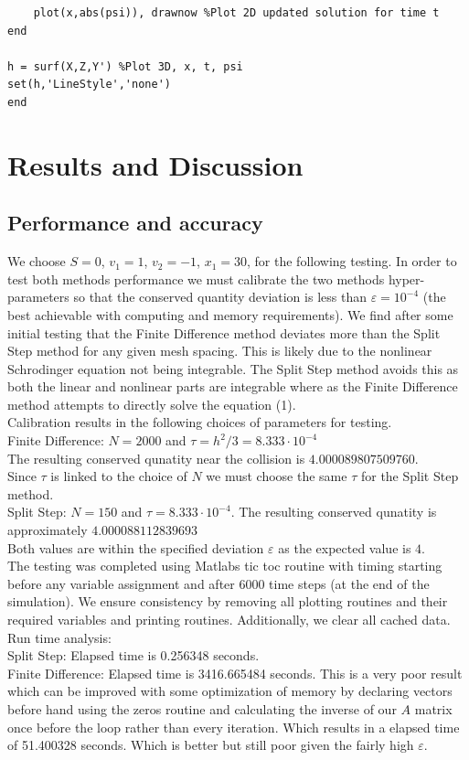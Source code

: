 \documentclass{article}
\begin{document}
\begin{lstlisting}
    plot(x,abs(psi)), drawnow %Plot 2D updated solution for time t
end

h = surf(X,Z,Y') %Plot 3D, x, t, psi
set(h,'LineStyle','none')
end
\end{lstlisting}
\pagebreak
\section{Results and Discussion}
\subsection{Performance and accuracy}
We choose $S=0$, $v_1 = 1$, $v_2 = -1$, $x_1 = 30$, for the following testing. 
In order to test both methods performance we must calibrate the two methods hyper-parameters so that the conserved quantity deviation is less than $\varepsilon = 10^{-4}$ (the best achievable with computing and memory requirements). We find after some initial testing that the Finite Difference method deviates more than the Split Step method for any given mesh spacing. This is likely due to the nonlinear Schrodinger equation not being integrable. The Split Step method avoids this as both the linear and nonlinear parts are integrable where as the Finite Difference method attempts to directly solve the equation (1). \\
Calibration results in the following choices of parameters for testing. \\
Finite Difference: $N=2000$ and $\tau = h^2/3 = 8.333\cdot 10^{-4}$ \\
The resulting conserved qunatity near the collision is $4.000089807509760$.\\
Since $\tau$ is linked to the choice of $N$ we must choose the same $\tau$ for the Split Step method. \\
Split Step: $N=150$ and $\tau = 8.333\cdot 10^{-4}$. The resulting conserved qunatity is approximately $4.000088112839693$\\
Both values are within the specified deviation $\varepsilon$ as the expected value is $4$.\\
The testing was completed using Matlabs tic toc routine with timing starting before any variable assignment and after $6000$ time steps (at the end of the simulation). 
We ensure consistency by removing all plotting routines and their required variables and printing routines. Additionally, we clear all cached data.\\
Run time analysis:\\
Split Step: Elapsed time is 0.256348 seconds.\\
Finite Difference:  Elapsed time is 3416.665484 seconds. This is a very poor result which can be improved with some optimization of memory by declaring vectors before hand using the zeros routine and calculating the inverse of our $A$ matrix once before the loop rather than every iteration. Which results in a elapsed time of 51.400328 seconds. Which is better but still poor given the fairly high $\varepsilon$.
\end{document}
